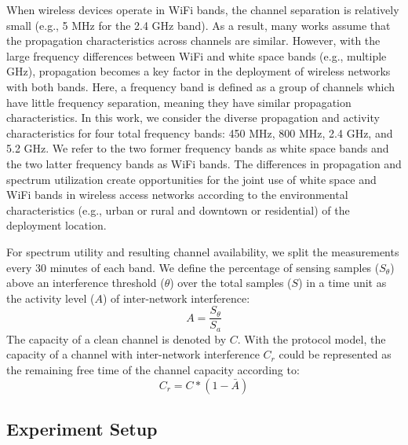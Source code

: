 When wireless devices operate in WiFi bands, the channel separation is relatively 
small (e.g., 5 MHz for the 2.4 GHz band). As a result, many works assume that
the propagation characteristics across channels are similar. However, with the
large frequency differences between WiFi and white space bands (e.g., multiple GHz),
propagation becomes a key factor in the deployment of wireless networks with both bands.
Here, a frequency band is defined as a group of channels which have
little frequency separation, meaning they have similar propagation characteristics.
In this work, we consider the diverse propagation and activity characteristics
for four total frequency bands: 450 MHz, 800 MHz, 2.4 GHz, and 5.2 GHz.
We refer to the two former frequency bands as white space bands and
the two latter frequency bands as WiFi bands.
The differences in propagation and spectrum utilization create opportunities
for the joint use of white space and WiFi bands in wireless access networks according
to the environmental characteristics (e.g., urban or rural and downtown or residential)
of the deployment location.


For spectrum utility and resulting channel availability, 
we split the measurements every 30 minutes of each band.  We define the percentage of sensing 
samples ($S_\theta$) above an interference threshold ($\theta$) over the total samples ($S$) in 
a time unit as the activity level ($A$) of inter-network interference:
\begin{equation}
\label{eq:actdef}
A=\frac{S_\theta}{S_a}
\end{equation}
The capacity of a clean channel is denoted by $C$. With the protocol model, the capacity 
of a channel with inter-network interference $C_r$ could be represented as 
the remaining free time of the channel capacity according to: 
\begin{equation}
\label{eq:intercap}
C_r=C*(1-\bar{A})
\end{equation}





\subsection{Experiment Setup}
\label{subsec:experimentsetup}

